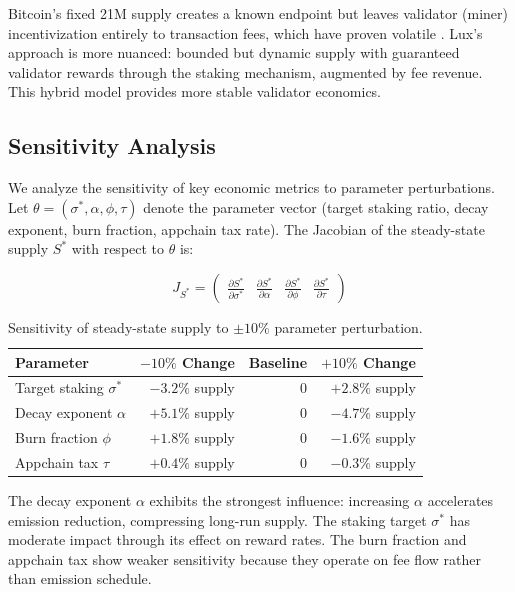 \begin{remark}
Bitcoin's fixed 21M supply creates a known endpoint but leaves validator (miner) incentivization entirely to transaction fees, which have proven volatile \cite{easley2019mining}. Lux's approach is more nuanced: bounded but dynamic supply with guaranteed validator rewards through the staking mechanism, augmented by fee revenue. This hybrid model provides more stable validator economics.
\end{remark}

\subsection{Sensitivity Analysis}

We analyze the sensitivity of key economic metrics to parameter perturbations. Let $\theta = (\sigma^*, \alpha, \phi, \tau)$ denote the parameter vector (target staking ratio, decay exponent, burn fraction, appchain tax rate). The Jacobian of the steady-state supply $S^*$ with respect to $\theta$ is:

\begin{equation}
    J_{S^*} = \begin{pmatrix} \frac{\partial S^*}{\partial \sigma^*} & \frac{\partial S^*}{\partial \alpha} & \frac{\partial S^*}{\partial \phi} & \frac{\partial S^*}{\partial \tau} \end{pmatrix}
\end{equation}

\begin{table}[h]
\centering
\caption{Sensitivity of steady-state supply to $\pm 10\%$ parameter perturbation.}
\label{tab:sensitivity-steadystate}
\begin{tabular}{lrrr}
\toprule
\textbf{Parameter} & \textbf{$-10\%$ Change} & \textbf{Baseline} & \textbf{$+10\%$ Change} \\
\midrule
Target staking $\sigma^*$ & $-3.2\%$ supply & 0 & $+2.8\%$ supply \\
Decay exponent $\alpha$ & $+5.1\%$ supply & 0 & $-4.7\%$ supply \\
Burn fraction $\phi$ & $+1.8\%$ supply & 0 & $-1.6\%$ supply \\
Appchain tax $\tau$ & $+0.4\%$ supply & 0 & $-0.3\%$ supply \\
\bottomrule
\end{tabular}
\end{table}

The decay exponent $\alpha$ exhibits the strongest influence: increasing $\alpha$ accelerates emission reduction, compressing long-run supply. The staking target $\sigma^*$ has moderate impact through its effect on reward rates. The burn fraction and appchain tax show weaker sensitivity because they operate on fee flow rather than emission schedule.


